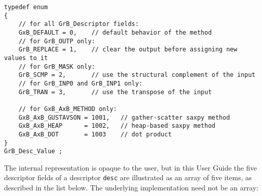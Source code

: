 \documentclass[12pt]{article}
\begin{document}
\begin{mdframed}[userdefinedwidth=6in]
{\footnotesize
\begin{verbatim}
typedef enum
{
    // for all GrB_Descriptor fields:
    GxB_DEFAULT = 0,    // default behavior of the method
    // for GrB_OUTP only:
    GrB_REPLACE = 1,    // clear the output before assigning new values to it
    // for GrB_MASK only:
    GrB_SCMP = 2,       // use the structural complement of the input
    // for GrB_INP0 and GrB_INP1 only:
    GrB_TRAN = 3,       // use the transpose of the input

    // for GxB_AxB_METHOD only:
    GxB_AxB_GUSTAVSON = 1001,   // gather-scatter saxpy method
    GxB_AxB_HEAP      = 1002,   // heap-based saxpy method
    GxB_AxB_DOT       = 1003    // dot product
}
GrB_Desc_Value ;
\end{verbatim} } \end{mdframed}

\newpage
The internal representation is opaque to the user, but in this User Guide the
five descriptor fields of a descriptor \verb'desc' are illustrated as an array
of five items, as described in the list below.  The underlying implementation
need not be an array:
\end{document}
